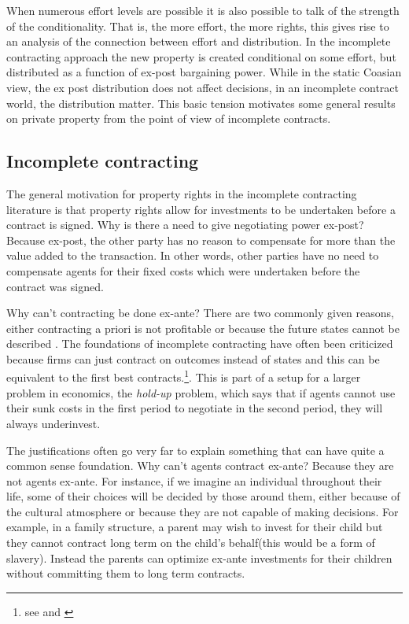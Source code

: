 \documentclass[12pt]{article}
\numberwithin{equation}{section}
\begin{document}
When numerous effort levels are possible it is also possible to talk of the strength of the conditionality. That is, the more effort, the more rights, this gives rise to an analysis of the connection between effort and distribution. In the incomplete contracting approach the new property is created conditional on some effort, but distributed as a function of ex-post bargaining power. While in the static Coasian view, the ex post distribution does not affect decisions, in an incomplete contract world, the distribution matter. This basic tension motivates some general results on private property from the point of view of incomplete contracts.

\subsection{Incomplete contracting}

The general motivation for property rights in the incomplete contracting literature is that property rights allow for investments to be undertaken before a contract is signed. Why is there a need to give negotiating power ex-post? Because ex-post, the other party has no reason to compensate for more than the value added to the transaction. In other words, other parties have no need to compensate agents for their fixed costs which were undertaken before the contract was signed.

Why can't contracting be done ex-ante? There are two commonly given reasons, either contracting a priori is not profitable or because the future states cannot be described \cite{Hart1999}. The foundations of incomplete contracting have often been criticized because firms can just contract on outcomes instead of states and this can be equivalent to the first best contracts.\footnote{see \cite{Maskin2002} and \cite{maskin1999unforeseen}}. This is part of a setup for a larger problem in economics, the \textit{hold-up} problem, which says that if agents cannot use their sunk costs in the first period to negotiate in the second period, they will always underinvest.

The justifications often go very far to explain something that can have quite a common sense foundation. Why can't agents contract ex-ante? Because they are not agents ex-ante. For instance, if we imagine an individual throughout their life, some of their choices will be decided by those around them, either because of the cultural atmosphere or because they are not capable of making decisions. For example, in a family structure, a parent may wish to invest for their child but they cannot contract long term on the child's behalf(this would be a form of slavery). Instead the parents can optimize ex-ante investments for their children without committing them to long term contracts.
\end{document}
